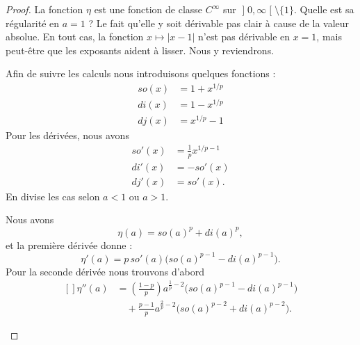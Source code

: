 \begin{proof}
    La fonction \( \eta\) est une fonction de classe \(  C^{\infty}\) sur \( \mathopen] 0 , \infty \mathclose[\setminus\{ 1 \}\). Quelle est sa régularité en \( a=1\) ? Le fait qu'elle y soit dérivable pas clair à cause de la valeur absolue. En tout cas, la fonction \( x\mapsto| x-1 |\) n'est pas dérivable en \( x=1\), mais peut-être que les exposants aident à lisser. Nous y reviendrons.

        Afin de  suivre les calculs nous introduisons quelques fonctions :
        \begin{subequations}
            \begin{align}
                so(x) & =1+x^{1/p} \\
                di(x) & =1-x^{1/p} \\
                dj(x) & =x^{1/p}-1
            \end{align}
        \end{subequations}
        Pour les dérivées, nous avons
        \begin{subequations}
            \begin{align}
                so'(x) & =\frac{1}{ p }x^{1/p-1} \\
                di'(x) & =-so'(x)                \\
                dj'(x) & =so'(x).
            \end{align}
        \end{subequations}
        En divise les cas selon \( a<1\) ou \( a>1\).
        \begin{subproof}
            \spitem[Pour \( a<1\)]
            Nous avons
            \begin{equation}
                \eta(a)=so(a)^p+di(a)^p,
            \end{equation}
            et la première dérivée donne :
            \begin{equation}        \label{EQooCLXZooXClOwd}
                \eta'(a)=p\,so'(a)\big( so(a)^{p-1}-di(a)^{p-1} \big).
            \end{equation}
            Pour la seconde dérivée nous trouvons d'abord
            \begin{equation}
                \begin{aligned}[]
                    \eta''(a) & =\left( \frac{ 1-p }{ p } \right)a^{\frac{ 1 }{ p }-2}\big( so(a)^{p-1}-di(a)^{p-1} \big) \\
                              & \quad+\frac{ p-1 }{ p }a^{\frac{ 2 }{ p }-2}\big( so(a)^{p-2}+di(a)^{p-2} \big).

\end{aligned}
\end{equation}
\end{subproof}
\end{proof}
